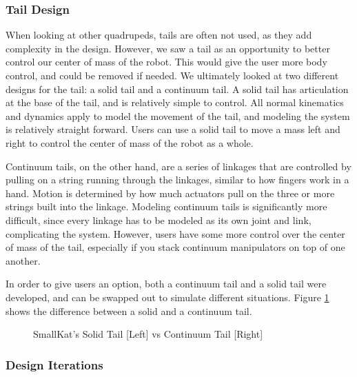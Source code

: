         \subsubsection{Tail Design}
            When looking at other quadrupeds, tails are often not used, as they add complexity in the design. However, we saw a tail as an opportunity to better control our center of mass of the robot. This would give the user more body control, and could be removed if needed. We ultimately looked at two different designs for the tail: a solid tail and a continuum tail. A solid tail has articulation at the base of the tail, and is relatively simple to control. All normal kinematics and dynamics apply to model the movement of the tail, and modeling the system is relatively straight forward. Users can use a solid tail to move a mass left and right to control the center of mass of the robot as a whole.

            Continuum tails, on the other hand, are a series of linkages that are controlled by pulling on a string running through the linkages, similar to how fingers work in a hand. Motion is determined by how much actuators pull on the three or more strings built into the linkage. Modeling continuum tails is significantly more difficult, since every linkage has to be modeled as its own joint and link, complicating the system. However, users have some more control over the center of mass of the tail, especially if you stack continuum manipulators on top of one another.

            In order to give users an option, both a continuum tail and a solid tail were developed, and can be swapped out to simulate different situations. Figure \ref{fig:TailComparison} shows the difference between a solid and a continuum tail.
            
            \begin{figure}[H]
                \centering

                \caption{SmallKat's Solid Tail [Left] vs Continuum Tail [Right]}
                \label{fig:TailComparison}
            \end{figure}
        
        
        
        
            
        \subsubsection{Design Iterations} 
         
